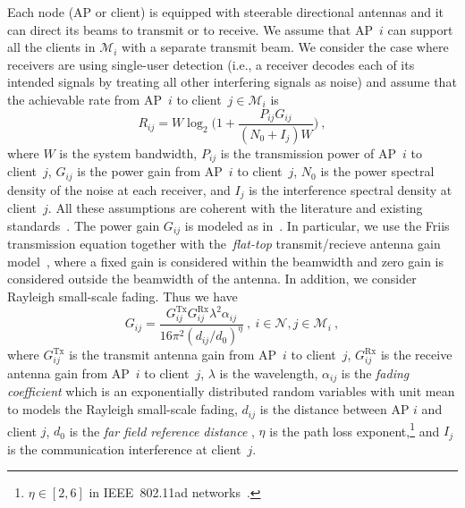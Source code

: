 \documentclass[journal, 10pt, twocolumn]{IEEEtran}
\newcommand{\be}{\begin{equation}}
\newcommand{\ee}{\end{equation}}
\begin{document}
Each node (AP or client) is equipped with steerable directional antennas and it can direct its beams to transmit or to receive. We assume that AP~$i$ can support all the clients in $\mathcal{M}_i$ with a separate transmit beam. We consider the case where receivers are using single-user detection (i.e., a receiver decodes each of its intended signals by treating all other interfering signals as noise) and assume that the achievable rate from AP~$i$ to client~$j\in\mathcal{M}_i$ is
\begin{equation} \label{eq:AWGN}
R_{ij} = W\log_2\bigg (1+\frac{P_{ij}G_{ij}}{(N_0+I_{j})W}\bigg)\ ,
\end{equation}
where $W$ is the system bandwidth, $P_{ij}$ is the transmission power of AP~$i$ to client~$j$, $G_{ij}$ is the power gain from AP~$i$ to client~$j$, $N_0$ is the power spectral density of the noise at each receiver, and $I_{j}$ is the interference spectral density at client~$j$. All these assumptions are coherent with the literature and existing standards~\cite{802_11ad, 802_15_3c}. The power gain $G_{ij}$ is modeled as in~\cite{Qiao11}. In particular, we use the Friis transmission equation together with the~\emph{flat-top} transmit/recieve antenna gain model~\cite{Mudumbai09}, where a fixed gain is considered within the beamwidth and zero gain is considered outside the beamwidth of the antenna. In addition, we consider Rayleigh small-scale fading. Thus we have
\be\label{eq:gain_coefficient}
G_{ij} = \frac{G^{\mathrm{Tx}}_{ij}G^{\mathrm{Rx}}_{ij}\lambda^2\alpha_{ij}}{16\pi^2(d_{ij}/d_0)^\eta} \ , \ i\in\mathcal{N}, j\in\mathcal{M}_i \ ,
\ee
where $G^{\mathrm{Tx}}_{ij}$ is the transmit antenna gain from AP~$i$ to client~$j$, $G^{\mathrm{Rx}}_{ij}$ is the receive antenna gain from AP~$i$ to client~$j$, $\lambda$ is the wavelength, $\alpha_{ij}$ is the \emph{fading coefficient} which is an exponentially distributed random variables with unit mean to models the Rayleigh small-scale fading, $d_{ij}$ is the distance between AP $i$ and client $j$, $d_0$ is the \emph{far field reference distance} \cite{Anurag-Manjunath-Kuri-08}, $\eta$ is the path loss exponent,\footnote{$\eta\in [2,6]$ in IEEE~802.11ad networks~\cite{Geng09}.} and $I_{j}$ is the communication interference at client~$j$.
\end{document}
